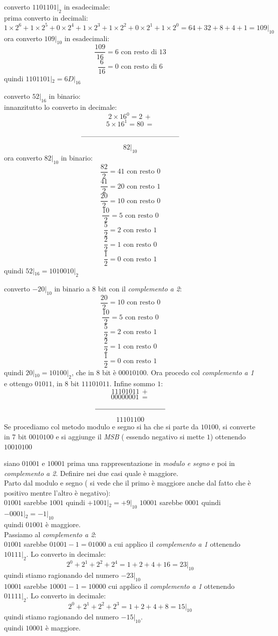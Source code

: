\documentclass[a4paper,12pt, oneside]{book}
\begin{document}
\begin{esercizio}
converto $1101101|_2$ in esadecimale:\\
prima converto in decimali:
$$1\times 2^6+ 1\times 2^5+ 0\times 2^4 +1 \times 2^3+ 1\times 2^2 +0\times 2^1+1\times 2^0=64+32+8+4+1=109|_{10}$$
ora converto $109|_{10}$ in esadecimali:
$$\frac{109}{16}=6 \mbox{ con resto di } 13$$
$$\frac{6}{16}=0 \mbox{ con resto di } 6$$
quindi $1101101|_2=6D|_{16}$ 
\end{esercizio}
\begin{esercizio}
converto $52|_{16}$ in binario:\\
innanzitutto lo converto in decimale:
$$2\times 16^0=2\,+$$
$$5\times 16^1= 80\,=$$
$$\rule{140pt}{.4pt}$$
$$82|_{10}$$
ora converto $82|_{10}$ in binario:
$$\frac{82}{2}=41 \mbox{ con resto } 0$$
$$\frac{41}{2}=20 \mbox{ con resto } 1$$
$$\frac{20}{2}=10 \mbox{ con resto } 0$$
$$\frac{10}{2}=5 \mbox{ con resto } 0$$
$$\frac{5}{2}=2 \mbox{ con resto } 1$$
$$\frac{2}{2}=1 \mbox{ con resto } 0$$
$$\frac{1}{2}=0 \mbox{ con resto } 1$$
quindi $52|_{16}=1010010|_2$
\end{esercizio}
\begin{esercizio}
converto $-20|_{10}$ in binario a 8 bit con il \textit{complemento a 2}:
$$\frac{20}{2}=10 \mbox{ con resto } 0$$
$$\frac{10}{2}=5 \mbox{ con resto } 0$$
$$\frac{5}{2}=2 \mbox{ con resto } 1$$
$$\frac{2}{2}=1 \mbox{ con resto } 0$$
$$\frac{1}{2}=0 \mbox{ con resto } 1$$
quindi $20|_{10}=10100|_2$, che in 8 bit è $00010100$. Ora procedo col \textit{complemento a 1} e ottengo $01011$, in 8 bit $11101011$. Infine sommo $1$:
$$11101011\,+$$
$$00000001\,=$$
$$\rule{100pt}{.4pt}$$
$$11101100$$
Se procediamo col metodo modulo e segno si ha che si parte da $10100$, si converte in 7 bit $0010100$ e si aggiunge il \textit{MSB} ( essendo negativo si mette $1$) ottenendo $10010100$
\end{esercizio}
\begin{esercizio}[???]
siano $01001$ e $10001$ prima una rappresentazione in \textit{modulo e segno} e poi in \textit{complemento a 2}. Definire nei due casi quale è maggiore.\\
Parto dal modulo e segno ( si vede che il primo è maggiore anche dal fatto che è positivo mentre l'altro è negativo):\\
$01001$ sarebbe $1001$ quindi $+1001|_2=+9|_{10}$
$10001$ sarebbe $0001$ quindi $-0001|_2=-1|_{10}$\\
quindi $01001$ è maggiore.\\
Passiamo al \textit{complemento a 2}:\\
$01001$ sarebbe $01001-1=01000$ a cui applico il \textit{complemento a 1} ottenendo $10111|_2$. Lo converto in decimale:\\
$$2^0+2^1+2^2+2^4=1+2+4+16=23|_{10}$$ quindi stiamo ragionando del numero $-23|_{10}$\\
$10001$ sarebbe $10001-1=10000$  cui applico il \textit{complemento a 1} ottenendo $01111|_2$. Lo converto in decimale:\\
$$2^0+2^1+2^2+2^3=1+2+4+8=15|_{10}$$ quindi stiamo ragionando del numero $-15|_{10}$.\\quindi $10001$ è maggiore.
\end{esercizio}
\end{document}
